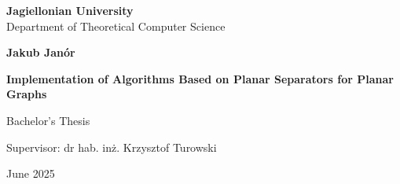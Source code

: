 \begin{titlepage}
  \begin{center}

    \large
    \textbf{Jagiellonian University}\\
    Department of Theoretical Computer Science\\

    \vspace{1.5cm}

    \Large
    \textbf{Jakub Janór}

    \vspace*{2cm}

    \textbf{\LARGE Implementation of Algorithms Based on Planar Separators for Planar Graphs}

    \vspace{0.5cm}
    \large

    \vfill
    \Large
    Bachelor's Thesis

    \vfill
    \Large
    Supervisor: dr hab. in\.z. Krzysztof Turowski

    \vspace{0.8cm}

    June 2025

  \end{center}
\end{titlepage}